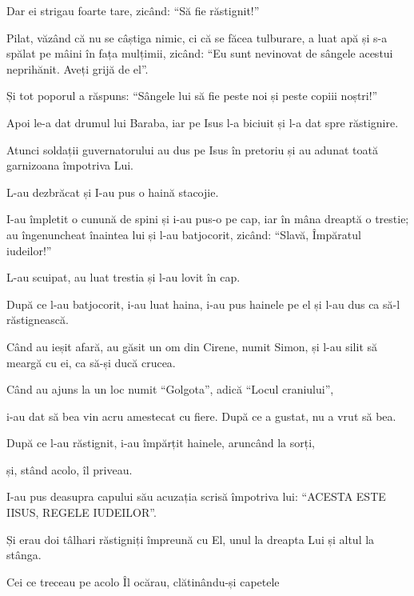 {\par }{\PP Dar ei strigau foarte tare, zicând: “Să fie răstignit!”


\par }{\PP {}Pilat, văzând că nu se câștiga nimic, ci că se făcea tulburare, a luat apă și s-a spălat pe mâini în fața mulțimii, zicând: “Eu sunt nevinovat de sângele acestui neprihănit. Aveți grijă de el”.


\par }{\PP {}Și tot poporul a răspuns: “Sângele lui să fie peste noi și peste copiii noștri!”


\par }{\PP {}Apoi le-a dat drumul lui Baraba, iar pe Isus l-a biciuit și l-a dat spre răstignire.


\par }{\PP {}Atunci soldații guvernatorului au dus pe Isus în pretoriu și au adunat toată garnizoana împotriva Lui.

L-au dezbrăcat și I-au pus o haină stacojie.

I-au împletit o cunună de spini și i-au pus-o pe cap, iar în mâna dreaptă o trestie; au îngenuncheat înaintea lui și l-au batjocorit, zicând: “Slavă, Împăratul iudeilor!”

L-au scuipat, au luat trestia și l-au lovit în cap.

După ce l-au batjocorit, i-au luat haina, i-au pus hainele pe el și l-au dus ca să-l răstignească.


\par }{\PP {}Când au ieșit afară, au găsit un om din Cirene, numit Simon, și l-au silit să meargă cu ei, ca să-și ducă crucea.

Când au ajuns la un loc numit “Golgota”, adică “Locul craniului”,

i-au dat să bea vin acru amestecat cu fiere. După ce a gustat, nu a vrut să bea.

După ce l-au răstignit, i-au împărțit hainele, aruncând la sorți,

și, stând acolo, îl priveau.

I-au pus deasupra capului său acuzația scrisă împotriva lui: “ACESTA ESTE IISUS, REGELE IUDEILOR”.


\par }{\PP {}Și erau doi tâlhari răstigniți împreună cu El, unul la dreapta Lui și altul la stânga.


\par }{\PP {}Cei ce treceau pe acolo Îl ocărau, clătinându-și capetele

}
